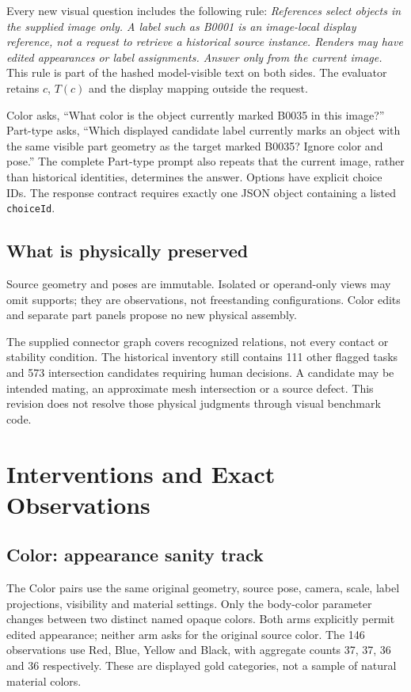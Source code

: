 \documentclass[10pt,twocolumn,letterpaper]{article}
\begin{document}
Every new visual question includes the following rule:
\emph{References select objects in the supplied image only. A label
such as B0001 is an image-local display reference, not a request to
retrieve a historical source instance. Renders may have edited
appearances or label assignments. Answer only from the current image.}
This rule is part of the hashed model-visible text on both sides.
The evaluator retains $c$, $T(c)$ and the display mapping outside
the request.

Color asks, ``What color is the object currently marked B0035 in
this image?'' Part-type asks, ``Which displayed candidate label
currently marks an object with the same visible part geometry as
the target marked B0035? Ignore color and pose.'' The complete
Part-type prompt also repeats that the current image, rather than
historical identities, determines the answer. Options have explicit
choice IDs. The response contract requires exactly one JSON object
containing a listed \texttt{choiceId}.

\subsection{What is physically preserved}
Source geometry and poses are immutable. Isolated or operand-only
views may omit supports; they are observations, not freestanding
configurations. Color edits and separate part panels propose no new
physical assembly.

The supplied connector graph covers recognized relations, not every
contact or stability condition. The historical inventory still contains
111 other flagged tasks and 573 intersection candidates requiring
human decisions. A candidate may be intended mating, an approximate
mesh intersection or a source defect. This revision does not resolve
those physical judgments through visual benchmark code.

\section{Interventions and Exact Observations}
\subsection{Color: appearance sanity track}
The \EvColor{} Color pairs use the same original geometry, source
pose, camera, scale, label projections, visibility and material
settings. Only the body-color parameter changes between two distinct
named opaque colors. Both arms explicitly permit edited appearance;
neither arm asks for the original source color. The 146 observations
use Red, Blue, Yellow and Black, with aggregate counts 37, 37, 36 and
36 respectively. These are displayed gold categories, not a sample
of natural material colors.
\end{document}
